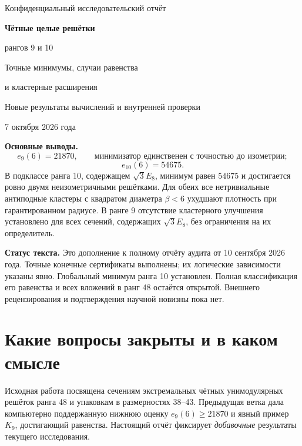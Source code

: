 \documentclass[11pt,a4paper]{article}
\theoremstyle{remark}\newtheorem{remark}[theorem]{Замечание}
\begin{document}
\begin{titlepage}
\vspace*{18mm}
{\Large\sffamily Конфиденциальный исследовательский отчёт\par}
\vspace{14mm}
{\huge\bfseries Чётные целые решётки\par рангов 9 и 10\par}
\vspace{9mm}
{\Large Точные минимумы, случаи равенства\par и кластерные расширения\par}
\vspace{12mm}
{\large Новые результаты вычислений и внутренней проверки\par 7 октября 2026 года\par}
\vspace{14mm}
\textbf{Основные выводы.}
\[
e_9(6)=21870,\qquad \text{минимизатор единственен с точностью до изометрии};
\]
\[
e_{10}(6)=54675.
\]
В подклассе ранга 10, содержащем $\sqrt3E_8$, минимум равен $54675$ и достигается ровно двумя неизометричными решётками. Для обеих все нетривиальные антиподные кластеры с квадратом диаметра $\beta<6$ ухудшают плотность при гарантированном радиусе. В ранге 9 отсутствие кластерного улучшения установлено для всех сечений, содержащих $\sqrt3E_8$, без ограничения на их определитель.

\vfill
\textbf{Статус текста.} Это дополнение к полному отчёту аудита от 10 сентября 2026 года. Точные конечные сертификаты выполнены; их логические зависимости указаны явно. Глобальный минимум ранга 10 установлен. Полная классификация его равенства и всех вложений в ранг 48 остаётся открытой. Внешнего рецензирования и подтверждения научной новизны пока нет.
\end{titlepage}
{\small\tableofcontents}
\newpage

\section{Какие вопросы закрыты и в каком смысле}

Исходная работа посвящена сечениям экстремальных чётных унимодулярных решёток ранга 48 и упаковкам в размерностях 38--43. Предыдущая ветка дала компьютерно поддержанную нижнюю оценку $e_9(6)\ge21870$ и явный пример $K_9$, достигающий равенства. Настоящий отчёт фиксирует \emph{добавочные} результаты текущего исследования.
\end{document}
